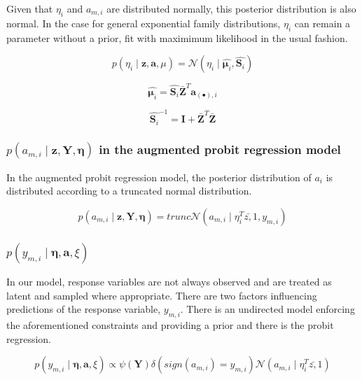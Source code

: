 \documentclass{article}
\begin{document}
Given that $\eta_{i}$ and $a_{m,i}$ are distributed normally, this
posterior distribution is also normal. In the case for general exponential
family distributions, $\eta_{i}$ can remain a parameter without a
prior, fit with maximimum likelihood in the usual fashion.

\begin{equation}
p\left(\eta_{i}\mid\mathbf{z},\mathbf{a},\mu\right)=\mathcal{N}\left(\eta_{i}\mid\hat{\mathbf{\mu}_{i}},\hat{\mathbf{S}_{i}}\right)\end{equation}


\[
\hat{\mathbf{\mu}_{i}}=\hat{\mathbf{S}_{i}}\bar{\mathbf{Z}}^{T}\mathbf{a}_{\left(\bullet\right),i}\]


\[
\hat{\mathbf{S}_{i}}^{-1}=\mathbf{I}+\bar{\mathbf{Z}}^{T}\bar{\mathbf{Z}}\]



\subsubsection{$p\left(a_{m,i}\mid\mathbf{z},\mathbf{Y},\mathbf{\eta}\right)$ in
the augmented probit regression model}

In the augmented probit regression model, the posterior distribution
of $a_{i}$ is distributed according to a truncated normal distribution.

\[
p\left(a_{m,i}\mid\mathbf{z},\mathbf{Y},\mathbf{\eta}\right)=trunc\mathcal{N}\left(a_{m,i}\mid\eta_{i}^{T}\bar{z,}1,y_{m,i}\right)\]



\subsubsection{\textmd{$p\left(y_{m,i}\mid\mathbf{\eta},\mathbf{a},\xi\right)$}}

In our model, response variables are not always observed and are treated
as latent and sampled where appropriate. There are two factors influencing
predictions of the response variable, $y_{m,i}$. There is an undirected
model enforcing the aforementioned constraints and providing a prior
and there is the probit regression.

\begin{equation}
p\left(y_{m,i}\mid\mathbf{\eta},\mathbf{a},\xi\right)\propto\psi\left(\mathbf{Y}\right)\delta\left(sign\left(a_{m,i}\right)=y_{m,i}\right)\mathcal{N}\left(a_{m,i}\mid\eta_{i}^{T}\bar{z,}1\right)\end{equation}
\end{document}
